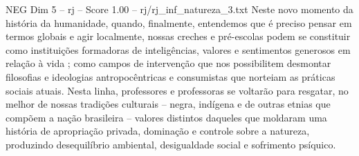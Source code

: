 \begin{textsample}{NEG Dim 5 – rj – Score 1.00 – rj/rj\_inf\_natureza\_3.txt}
Neste novo momento da história da humanidade, quando, finalmente, entendemos que é preciso pensar em termos globais e agir localmente, nossas creches e pré-escolas podem se constituir como instituições formadoras de inteligências, valores e sentimentos generosos em relação à vida ; como campos de intervenção que nos possibilitem desmontar filosofias e ideologias antropocêntricas e consumistas que norteiam as práticas sociais atuais.
Nesta linha, professores e professoras se voltarão para resgatar, no melhor de nossas tradições culturais – negra, indígena e de outras etnias que compõem a nação brasileira – valores distintos daqueles que moldaram uma história de apropriação privada, dominação e controle sobre a natureza, produzindo desequilíbrio ambiental, desigualdade social e sofrimento psíquico.

\end{textsample}

